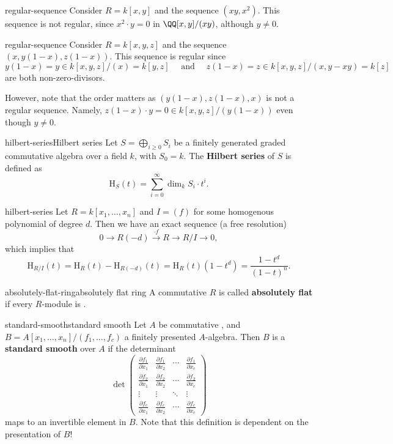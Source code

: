 \begin{example}{regular-sequence}
    Consider $R = k[x, y]$ and the sequence $(xy, x^2)$. This sequence is not regular, since $x^2 \cdot y = 0$ in $\QQ[x, y] / (xy)$, although $y \ne 0$.
\end{example}

\begin{example}{regular-sequence}
    Consider $R = k[x, y, z]$ and the sequence $(x, y(1 - x), z(1 - x))$. This sequence is regular since
    \[ y(1 - x) = y \in k[x, y, z]/(x) = k[y, z] \quad \text{ and } \quad z(1 - x) = z \in k[x, y, z]/(x, y - xy) = k[z] \]
    are both non-zero-divisors.
    
    However, note that the order matters as $(y(1 - x), z(1 - x), x)$ is not a regular sequence. Namely, $z(1 - x) \cdot y = 0 \in k[x, y, z] / (y(1 - x))$ even though $y \ne 0$.
\end{example}

\begin{topic}{hilbert-series}{Hilbert series}
    Let $S = \bigoplus_{i \ge 0} S_i$ be a finitely generated graded commutative algebra over a field $k$, with $S_0 = k$. The \textbf{Hilbert series} of $S$ is defined as
    \[ \text{H}_S(t) = \sum_{i = 0}^{\infty} \dim_k S_i \cdot t^i . \]
\end{topic}

\begin{example}{hilbert-series}
    Let $R = k[x_1, \ldots, x_n]$ and $I = (f)$ for some homogenous polynomial of degree $d$. Then we have an exact sequence (a free resolution)
    \[ 0 \to R(-d) \xrightarrow{\cdot f} R \to R / I \to 0 , \]
    which implies that
    \[ \text{H}_{R/I}(t) = \text{H}_R(t) - \text{H}_{R(-d)}(t) = \text{H}_R(t) (1 - t^d) = \frac{1 - t^d}{(1 - t)^n}. \]
\end{example}

\begin{topic}{absolutely-flat-ring}{absolutely flat ring}
    A commutative  $R$ is called \textbf{absolutely flat} if every $R$-module is .
\end{topic}

\begin{topic}{standard-smooth}{standard smooth}
    Let $A$ be commutative , and $B = A[x_1, \ldots, x_n] / (f_1, \ldots, f_c)$ a finitely presented $A$-algebra. Then $B$ is a \textbf{standard smooth} over $A$ if the determinant
    \[ \det \begin{pmatrix}
        \frac{\partial f_1}{\partial x_1} & \frac{\partial f_1}{\partial x_2} & \cdots & \frac{\partial f_1}{\partial x_c} \\
        \frac{\partial f_2}{\partial x_1} & \frac{\partial f_2}{\partial x_2} & \cdots & \frac{\partial f_2}{\partial x_c} \\ 
        \vdots & \vdots & \ddots & \vdots \\ 
        \frac{\partial f_c}{\partial x_1} & \frac{\partial f_c}{\partial x_2} & \cdots & \frac{\partial f_c}{\partial x_c}
    \end{pmatrix} \]
    maps to an invertible element in $B$. Note that this definition is dependent on the presentation of $B$!
\end{topic}

